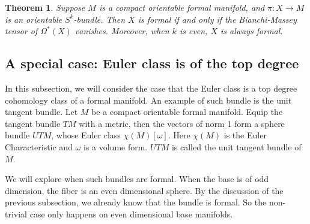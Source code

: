 \documentclass{article}
\theoremstyle{plain}
\newtheorem{thm}{Theorem}[section]
\theoremstyle{definition}
\theoremstyle{plain}
\numberwithin{equation}{section}
\begin{document}
\begin{thm}
Suppose $M$ is a compact orientable formal manifold, and $\pi:X\to M$ is an orientable $S^k$-bundle. Then $X$ is formal if and only if the Bianchi-Massey tensor of $\Omega^*(X)$ vanishes. Moreover, when $k$ is even, $X$ is always formal.
\end{thm}

\subsection{A special case: Euler class is of the top degree}

In this subsection, we will consider the case that the Euler class is a top degree cohomology class of a formal manifold. An example of such bundle is the unit tangent bundle. Let $M$ be a compact orientable formal manifold. Equip the tangent bundle $TM$ with a metric, then the vectors of norm 1 form a sphere bundle $UTM$, whose Euler class $\chi(M)[\omega]$. Here $\chi(M)$ is the Euler Characteristic and $\omega$ is a volume form. $UTM$ is called the unit tangent bundle of $M$.

We will explore when such bundles are formal. When the base is of odd dimension, the fiber is an even dimensional sphere. By the discussion of the previous subsection, we already know that the bundle is formal. So the non-trivial case only happens on even dimensional base manifolds.
\end{document}
